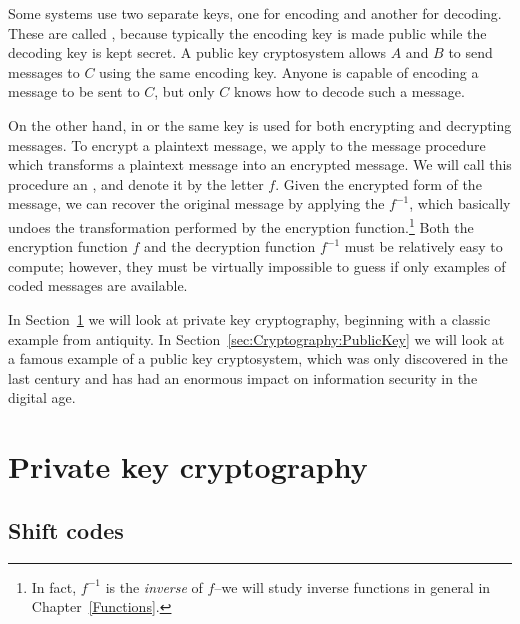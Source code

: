 Some systems  use two separate keys, one for encoding and another for
decoding. These are called , because typically the encoding key is made public
while the decoding key is kept secret. A public key
cryptosystem allows $A$ and $B$ to send messages to $C$ using the same
encoding key.  Anyone is capable of encoding a message to be sent to
$C$, but only $C$ knows how to decode such a message.
 
On the other hand, in  or
the same key is used for both encrypting and decrypting messages. To
encrypt a  plaintext message, we apply to the message procedure which transforms a  plaintext message into an encrypted message.  We will call this procedure an , and denote it by the letter $f$.  Given the encrypted form of the message, we can recover the 
original message by applying the  $f^{-1}$, which basically undoes the transformation performed by the encryption function.\footnote{In fact, $f^{-1}$ is the \emph{inverse} of $f$--we will study inverse functions in general in Chapter~\ref{Functions}.} 
Both the
encryption function $f$ and the decryption function $f^{-1}$ must be relatively easy to compute; however, they must be virtually impossible to guess if only
examples of coded messages are available.

In Section~\ref{sec:Cryptography:PrivateKey} we will look at private key cryptography, beginning  with a classic example from antiquity. In Section~\ref{sec:Cryptography:PublicKey} we will look at a famous example of a public key cryptosystem, 
which was only discovered in the last century and has had an enormous impact on information security in the digital age.
 
\section{Private key cryptography}
\label{sec:Cryptography:PrivateKey}
  
 
\subsection{Shift codes} 
\label{subsec:Cryptography:PrivateKey:ShiftCode}
 

